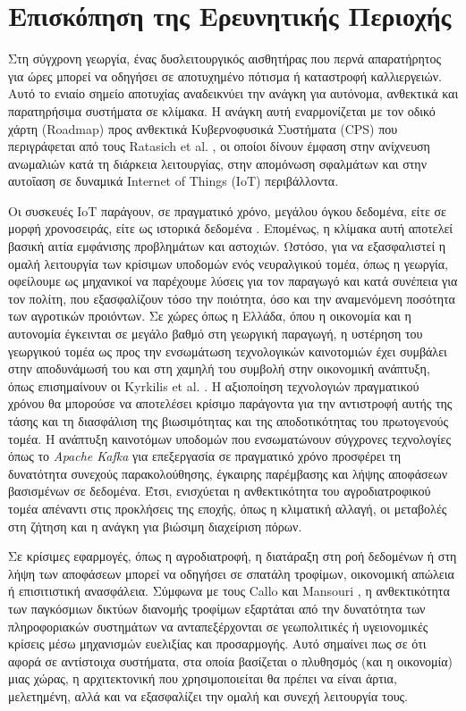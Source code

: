 \chapter{Επισκόπηση της Ερευνητικής Περιοχής}

Στη σύγχρονη γεωργία, ένας δυσλειτουργικός αισθητήρας που περνά απαρατήρητος για ώρες μπορεί να οδηγήσει σε αποτυχημένο πότισμα ή καταστροφή καλλιεργειών. Αυτό το ενιαίο σημείο αποτυχίας αναδεικνύει την ανάγκη για αυτόνομα, ανθεκτικά και παρατηρήσιμα συστήματα σε κλίμακα. Η ανάγκη αυτή εναρμονίζεται με τον οδικό χάρτη (Roadmap) προς ανθεκτικά Κυβερνοφυσικά Συστήματα (CPS) που περιγράφεται από τους Ratasich et al. \cite{iotcps}, οι οποίοι δίνουν έμφαση στην ανίχνευση ανωμαλιών κατά τη διάρκεια λειτουργίας, στην απομόνωση σφαλμάτων και στην αυτοΐαση σε δυναμικά Internet of Things (IoT) περιβάλλοντα.

Οι συσκευές IoT παράγουν, σε πραγματικό χρόνο, μεγάλου όγκου δεδομένα, είτε σε μορφή χρονοσειράς, είτε ως ιστορικά δεδομένα \cite{rtiotevents}. Επομένως, η κλίμακα αυτή αποτελεί βασική αιτία εμφάνισης προβλημάτων και αστοχιών. Ωστόσο, για να εξασφαλιστεί η ομαλή λειτουργία των κρίσιμων υποδομών ενός νευραλγικού τομέα, όπως η γεωργία, οφείλουμε ως μηχανικοί να παρέχουμε λύσεις για τον παραγωγό και κατά συνέπεια για τον πολίτη, που εξασφαλίζουν τόσο την ποιότητα, όσο και την αναμενόμενη ποσότητα των αγροτικών προιόντων. Σε χώρες όπως η Ελλάδα, όπου η οικονομία και η αυτονομία έγκεινται σε μεγάλο βαθμό στη γεωργική παραγωγή, η υστέρηση του γεωργικού τομέα ως προς την ενσωμάτωση τεχνολογικών καινοτομιών έχει συμβάλει στην αποδυνάμωσή του και στη χαμηλή του συμβολή στην οικονομική ανάπτυξη, όπως επισημαίνουν οι Kyrkilis et al. \cite{gragriculture}. Η αξιοποίηση τεχνολογιών πραγματικού χρόνου θα μπορούσε να αποτελέσει κρίσιμο παράγοντα για την αντιστροφή αυτής της τάσης και τη διασφάλιση της βιωσιμότητας και της αποδοτικότητας του πρωτογενούς τομέα. Η ανάπτυξη καινοτόμων υποδομών που ενσωματώνουν σύγχρονες τεχνολογίες όπως το \textit{Apache Kafka} για επεξεργασία σε πραγματικό χρόνο προσφέρει τη δυνατότητα συνεχούς παρακολούθησης, έγκαιρης παρέμβασης και λήψης αποφάσεων βασισμένων σε δεδομένα. Έτσι, ενισχύεται η ανθεκτικότητα του αγροδιατροφικού τομέα απέναντι στις προκλήσεις της εποχής, όπως η κλιματική αλλαγή, οι μεταβολές στη ζήτηση και η ανάγκη για βιώσιμη διαχείριση πόρων.

Σε κρίσιμες εφαρμογές, όπως η αγροδιατροφή, η διατάραξη στη ροή δεδομένων ή στη λήψη των αποφάσεων μπορεί να οδηγήσει σε σπατάλη τροφίμων, οικονομική απώλεια ή επισιτιστική ανασφάλεια. Σύμφωνα με τους Callo και Mansouri \cite{foodsec}, η ανθεκτικότητα των παγκόσμιων δικτύων διανομής τροφίμων εξαρτάται από την δυνατότητα των πληροφοριακών συστημάτων να ανταπεξέρχονται σε γεωπολιτικές ή υγειονομικές κρίσεις μέσω μηχανισμών ευελιξίας και προσαρμογής. Αυτό σημαίνει πως σε ότι αφορά σε αντίστοιχα συστήματα, στα οποία βασίζεται ο πλυθησμός (και η οικονομία) μιας χώρας, η αρχιτεκτονική που χρησιμοποιείται θα πρέπει να είναι άρτια, μελετημένη, αλλά και να εξασφαλίζει την ομαλή και συνεχή λειτουργία τους.

